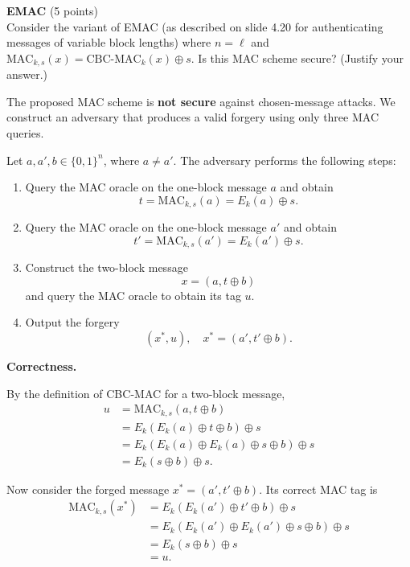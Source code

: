 \begin{problem}{\bf EMAC} (5 points)\\
Consider the variant of EMAC (as described on slide 4.20 for
authenticating messages of variable block lengths) where $n=\ell$ and
$\mbox{MAC}_{k,s}(x) = \mbox{CBC-MAC}_k(x) \oplus s$.
Is this MAC scheme secure?  (Justify your answer.)
\end{problem}

\begin{loigiai}
The proposed MAC scheme is \textbf{not secure} against
chosen-message attacks. We construct an adversary that
produces a valid forgery using only three MAC queries.

Let $a,a',b \in \{0,1\}^n$, where $a \neq a'$.
The adversary performs the following steps:

\begin{enumerate}
    \item Query the MAC oracle on the one-block message $a$
    and obtain
    \[
        t = \mathrm{MAC}_{k,s}(a)
          = E_k(a) \oplus s.
    \]

    \item Query the MAC oracle on the one-block message $a'$
    and obtain
    \[
        t' = \mathrm{MAC}_{k,s}(a')
           = E_k(a') \oplus s.
    \]

    \item Construct the two-block message
    \[
        x = (a, t \oplus b)
    \]
    and query the MAC oracle to obtain its tag $u$.

    \item Output the forgery
    \[
        \boxed{(x^*,u), \quad x^*=(a',t'\oplus b).}
    \]
\end{enumerate}

\textbf{Correctness.}

By the definition of CBC-MAC for a two-block message,
\[
\begin{aligned}
u
&= \mathrm{MAC}_{k,s}(a,t\oplus b)\\
&= E_k(E_k(a)\oplus t\oplus b)\oplus s\\
&= E_k(E_k(a)\oplus E_k(a)\oplus s\oplus b)
   \oplus s\\
&= E_k(s\oplus b)\oplus s.
\end{aligned}
\]

Now consider the forged message $x^*=(a',t'\oplus b)$.
Its correct MAC tag is
\[
\begin{aligned}
\mathrm{MAC}_{k,s}(x^*)
&= E_k(E_k(a')\oplus t'\oplus b)\oplus s\\
&= E_k(E_k(a')\oplus E_k(a')\oplus s\oplus b)
   \oplus s\\
&= E_k(s\oplus b)\oplus s\\
&= u.
\end{aligned}
\]


\end{loigiai}
